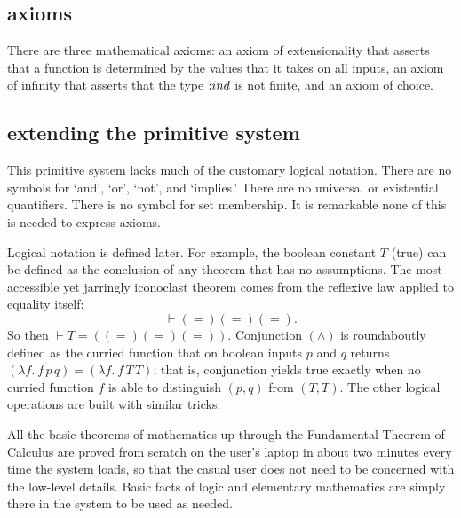 \documentclass{llncs}
\def\tc{\hbox{:}}
\begin{document}
\subsection{axioms}

There are three mathematical axioms: an axiom of extensionality that asserts
that a function is determined by the values that it takes on all inputs,
an axiom of infinity that asserts that the type $\tc ind$ is not finite, and an axiom of choice.

\subsection{extending the primitive system}

This primitive system 
lacks much of the customary logical notation.
There are no symbols for %
`and', `or', `not', and `implies.'  There are no universal or existential quantifiers.  There is no symbol for set membership.  
It is remarkable none of this is needed to express axioms.

Logical notation
is defined later.
For example, the boolean constant $T$ (true) can be defined as the conclusion of
any theorem that has no assumptions.  The most accessible yet jarringly iconoclast
theorem comes from the reflexive law applied to equality itself:
$$
\vdash ( = ) ( = ) ( = ).
$$
So then $\vdash T = ((=) (=) (=))$.  Conjunction $( \land )$
is roundaboutly defined as the
curried function %
 that on boolean inputs $p$ and $q$
returns $(\lambda f.\ f\, p\, q) = (\lambda f.\ f\, T\, T)$; that is,
conjunction yields  true exactly when no curried function $f$ is able to
distinguish $(p,q)$ from
$(T,T)$.
The other logical operations are built with similar tricks.

All the basic theorems of mathematics up through the Fundamental Theorem of Calculus are proved from scratch on the user's laptop in about two minutes every time the system loads,
so
that the casual user does not need to be concerned with the low-level details.
Basic facts of logic and elementary mathematics are simply there in the system
to be used as needed.
\end{document}
